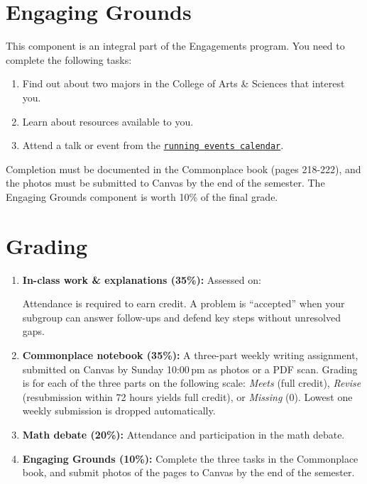 \documentclass[oneside,11pt]{amsart}
\begin{document}
\section{Engaging Grounds}

This component is an integral part of the Engagements program. You need to complete the
following tasks:
\begin{enumerate}
\item Find out about two majors in the College of Arts \& Sciences that interest you.

\item Learn about resources available to you.

\item Attend a talk or event from the \href{https://engagements.as.virginia.edu/engaging-grounds}{\texttt{running events calendar}}.
\end{enumerate}
Completion must be documented in the Commonplace book (pages 218-222), and the
photos must be submitted to Canvas by the end of the semester.
The Engaging Grounds component is worth 10\% of the final grade.

\section{Grading}

\begin{enumerate}[$\bullet$]
\item \textbf{In-class work \& explanations (35\%):}
Assessed on:
Attendance is required to earn credit. A problem is ``accepted'' when your subgroup can answer follow-ups and defend key steps without unresolved gaps.

 \item \textbf{Commonplace notebook (35\%):}
	A three-part weekly writing assignment, submitted
	on Canvas by Sunday 10:00\,pm as photos or a PDF scan.
	Grading is for each of the three parts on the following scale:
	\emph{Meets} (full credit),
	\emph{Revise}
	(resubmission within 72 hours yields full credit), or
	\emph{Missing} (0).
	Lowest one weekly submission is dropped
	automatically.

  \item \textbf{Math debate (20\%):}
	Attendance and participation in the math debate.

	\item \textbf{Engaging Grounds (10\%):}
	Complete the three tasks in the Commonplace book, and
	submit photos of the pages to Canvas by the end of the semester.
\end{enumerate}
\end{document}
